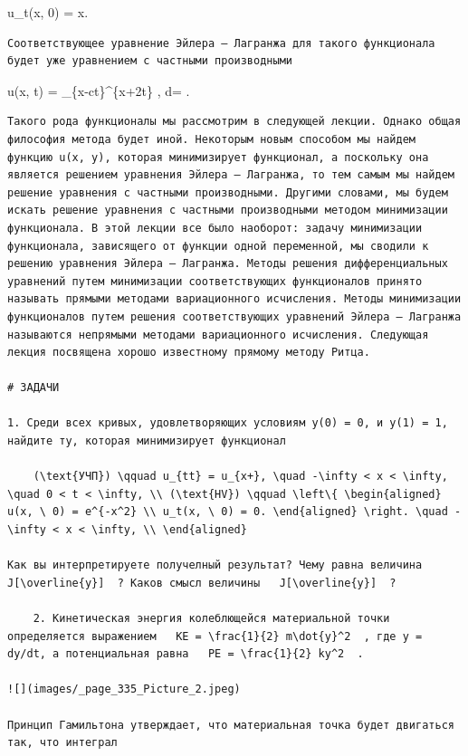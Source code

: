 \documentclass[
  ukrainian,
]{article}
\begin{document}
u\_t(x, 0) = \sin x.

\begin{verbatim}
Соответствующее уравнение Эйлера — Лагранжа для такого функционала будет уже уравнением с частными производными
\end{verbatim}

u(x, t) =  \int\_\{x-ct\}\^{}\{x+2t\} \sin \xi , d\xi =
 .

\begin{verbatim}
Такого рода функционалы мы рассмотрим в следующей лекции. Однако общая философия метода будет иной. Некоторым новым способом мы найдем функцию u(x, y), которая минимизирует функционал, а поскольку она является решением уравнения Эйлера — Лагранжа, то тем самым мы найдем решение уравнения с частными производными. Другими словами, мы будем искать решение уравнения с частными производными методом минимизации функционала. В этой лекции все было наоборот: задачу минимизации функционала, зависящего от функции одной переменной, мы сводили к решению уравнения Эйлера — Лагранжа. Методы решения дифференциальных уравнений путем минимизации соответствующих функционалов принято называть прямыми методами вариационного исчисления. Методы минимизации функционалов путем решения соответствующих уравнений Эйлера — Лагранжа называются непрямыми методами вариационного исчисления. Следующая лекция посвящена хорошо известному прямому методу Ритца.

# ЗАДАЧИ

1. Среди всех кривых, удовлетворяющих условиям y(0) = 0, и y(1) = 1, найдите ту, которая минимизирует функционал

    (\text{УЧП}) \qquad u_{tt} = u_{x+}, \quad -\infty < x < \infty, \quad 0 < t < \infty, \\ (\text{HV}) \qquad \left\{ \begin{aligned} u(x, \ 0) = e^{-x^2} \\ u_t(x, \ 0) = 0. \end{aligned} \right. \quad -\infty < x < \infty, \\ \end{aligned}

Как вы интерпретируете получелный результат? Чему равна величина   J[\overline{y}]  ? Каков смысл величины   J[\overline{y}]  ?

    2. Кинетическая энергия колеблющейся материальной точки определяется выражением   KE = \frac{1}{2} m\dot{y}^2  , где y = dy/dt, а потенциальная равна   PE = \frac{1}{2} ky^2  .

![](images/_page_335_Picture_2.jpeg)

Принцип Гамильтона утверждает, что материальная точка будет двигаться так, что интеграл
\end{verbatim}
\end{document}
